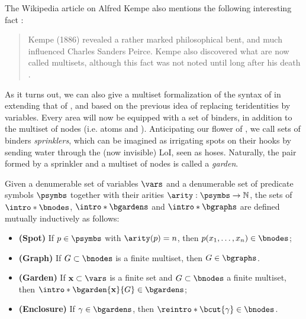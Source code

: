 \begin{scope}
The Wikipedia article on Alfred Kempe also mentions the following interesting
fact \cite{noauthor_alfred_2023}:
\begin{quote}
  Kempe (1886) revealed a rather marked philosophical bent, and much influenced
Charles Sanders Peirce. Kempe also discovered what are now called multisets,
although this fact was not noted until long after his death
.
\end{quote}
As it turns out, we can also give a multiset formalization of the syntax of
 in  extending that of , and based on the
previous idea of replacing teridentities by variables. Every area will now be
equipped with a set of binders, in addition to the multiset of nodes (i.e. atoms
and ). Anticipating our flower  of , we call
sets of binders \emph{sprinklers}, which can be imagined as irrigating spots on
their hooks by sending water through the (now invisible) LoI, seen as hoses.
Naturally, the pair formed by a sprinkler and a multiset of nodes is called a
\emph{garden}.

\begin{definition}[Graph] 
  
  Given a denumerable set of variables $\vars$ and a denumerable set of
  predicate symbols $\psymbs$ together with their arities $\arity : \psymbs \to
  \nats$, the sets of  $\intro*\bnodes$, 
  $\intro*\bgardens$ and  $\intro*\bgraphs$ are defined mutually
  inductively as follows:
  \begin{itemize}
    \item \textbf{(Spot)} If $p \in \psymbs$ with $\arity(p) = n$, then $p(x_1,
    \ldots, x_n) \in \bnodes$;
    \item \textbf{(Graph)} If $G \subset \bnodes$ is a finite multiset, then $G
    \in \bgraphs$.
    \item \textbf{(Garden)} If $\bx \subset \vars$ is a finite set and $G
    \subset \bnodes$ a finite multiset, then $\intro*\bgarden{\bx}{G} \in
    \bgardens$;
    \item \textbf{(Enclosure)} If $\gamma \in \bgardens$, then
    $\reintro*\bcut{\gamma} \in \bnodes$.
  \end{itemize}
\end{definition}


\end{scope}
